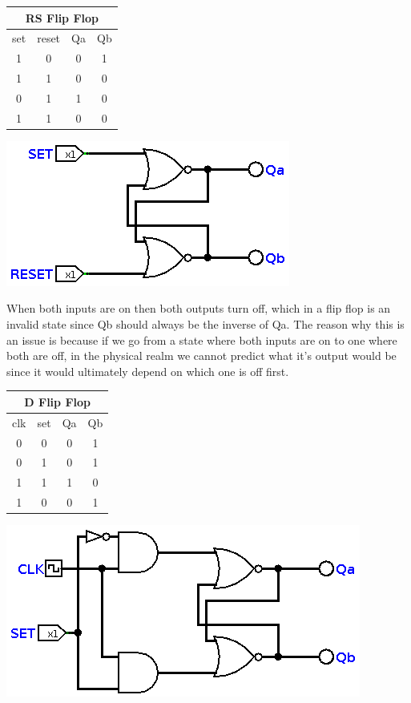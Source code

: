 \documentclass[11pt]{scrartcl}
\begin{document}
\pagebreak

\begin{center}
    \begin{tabular}{c c|c c}
        \multicolumn{4}{c}{RS Flip Flop} \\
        \hline
        set & reset & Qa & Qb \\
        1 & 0 & 0 & 1 \\
        1 & 1 & 0 & 0 \\
        0 & 1 & 1 & 0 \\
        1 & 1 & 0 & 0 \\
    \end{tabular}

    \includegraphics[scale=0.6]{images/rsflipflop.png}
\end{center}

When both inputs are on then both outputs turn off, which in a flip flop is an invalid state since Qb should always be the inverse of Qa.
The reason why this is an issue is because if we go from a state where both inputs are on to one where both are off, in the physical
realm we cannot predict what it's output would be since it would ultimately depend on which one is off first.

\begin{center}
    \begin{tabular}{c c|c c}
        \multicolumn{4}{c}{D Flip Flop} \\
        \hline
        clk & set & Qa & Qb \\
        0 & 0 & 0 & 1 \\
        0 & 1 & 0 & 1 \\
        1 & 1 & 1 & 0 \\
        1 & 0 & 0 & 1 \\
    \end{tabular}

    \includegraphics[scale=0.6]{images/dflipflop.png}
\end{center}
\end{document}
